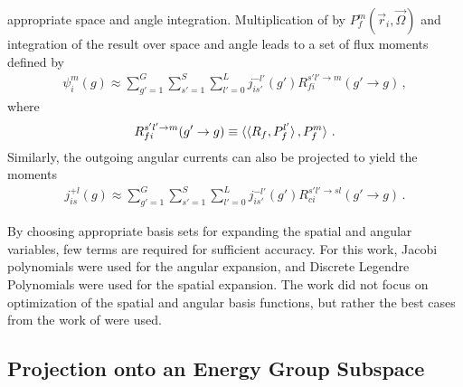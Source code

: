 appropriate space and angle integration.  Multiplication of 
 by $P^{m}_{f}(\vec{r}_i, \vec{\Omega})$ and
integration of the result over space and angle leads to a set of flux moments 
defined by
\begin{equation}
    \begin{split}
        \psi^{m}_{i}(g) \approx 
        \sum^{G}_{g'=1} \sum^{S}_{s'=1} \sum_{l'=0}^L  
        j^{-l'}_{is'}(g') R^{s'l' \to m}_{fi}(g'\to g)  \, ,
    \end{split}           
    \label{eq:fluxmoments}
\end{equation}
where
\begin{equation}
    R^{s'l' \to m}_{fi}(g'\to g) \equiv  
    \braket{ \braket{ R_{f}, P^{l'}_f}, P^{m}_f} \, .
\end{equation}
Similarly, the outgoing angular currents can also be projected to yield the 
moments
\begin{equation}
    \begin{split}
        j^{+l}_{is}(g) \approx 
        \sum^{G}_{g'=1} \sum^{S}_{s'=1} \sum_{l'=0}^L  
        j^{-l'}_{is'}(g') R^{s'l' \to sl}_{ci}(g'\to g)  \, .        
    \end{split}              
    \label{eq:jmoments}
\end{equation}

By choosing appropriate basis sets for expanding the spatial and angular 
variables, few terms are required for sufficient accuracy.  For this work, 
Jacobi 
polynomials were used for the angular expansion, and Discrete Legendre 
Polynomials were used for the spatial expansion.  The work did not focus on 
optimization of the spatial and angular basis functions, but rather the best 
cases from the work of \citet{RobertsSerment} were used.

\subsection{Projection onto an Energy Group Subspace}


